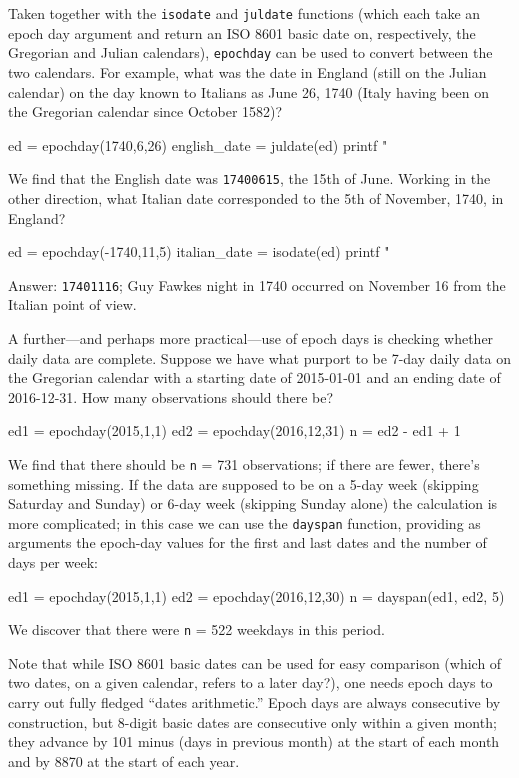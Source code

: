 Taken together with the \texttt{isodate} and \texttt{juldate}
functions (which each take an epoch day argument and return an ISO
8601 basic date on, respectively, the Gregorian and Julian calendars),
\texttt{epochday} can be used to convert between the two calendars.
For example, what was the date in England (still on the Julian
calendar) on the day known to Italians as June 26, 1740 (Italy having
been on the Gregorian calendar since October 1582)?
%
\begin{code}
ed = epochday(1740,6,26)
english_date = juldate(ed)
printf "%
\end{code}
%
We find that the English date was \texttt{17400615}, the 15th of June.
Working in the other direction, what Italian date corresponded to the
5th of November, 1740, in England?
%
\begin{code}
ed = epochday(-1740,11,5)
italian_date = isodate(ed)
printf "%
\end{code}
%
Answer: \texttt{17401116}; Guy Fawkes night in 1740 occurred on 
November 16 from the Italian point of view.

A further---and perhaps more practical---use of epoch days is checking
whether daily data are complete. Suppose we have what purport to be
7-day daily data on the Gregorian calendar with a starting date of
2015-01-01 and an ending date of 2016-12-31. How many observations
should there be?
%
\begin{code}
ed1 = epochday(2015,1,1)
ed2 = epochday(2016,12,31)
n = ed2 - ed1 + 1
\end{code}
We find that there should be \texttt{n} = 731 observations; if there
are fewer, there's something missing. If the data are supposed to be
on a 5-day week (skipping Saturday and Sunday) or 6-day week (skipping
Sunday alone) the calculation is more complicated; in this case we can
use the \texttt{dayspan} function, providing as arguments the
epoch-day values for the first and last dates and the number of days
per week:
\begin{code}
ed1 = epochday(2015,1,1)
ed2 = epochday(2016,12,30)
n = dayspan(ed1, ed2, 5)
\end{code}
%
We discover that there were \texttt{n} = 522 weekdays in this period.

Note that while ISO 8601 basic dates can be used for easy comparison
(which of two dates, on a given calendar, refers to a later day?),
one needs epoch days to carry out fully fledged ``dates arithmetic.''
Epoch days are always consecutive by construction, but 8-digit
basic dates are consecutive only within a given month; they advance by
101 minus (days in previous month) at the start of each month and by
8870 at the start of each year.

